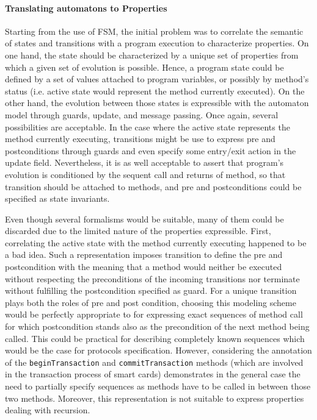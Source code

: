 \paragraph{Translating automatons to Properties}
Starting from the use of FSM, the initial problem was to correlate the semantic of states and transitions with a program execution to characterize properties. On one hand, the state should be characterized by a unique set of properties from which a given set of evolution is possible. Hence, a program state could be defined by a set of values attached to program variables, or possibly by method's status (i.e. active state would represent the method currently executed). On the other hand, the evolution between those states is expressible with the automaton model through guards, update, and message passing. Once again, several possibilities are acceptable. In the case where the active state represents the method currently executing, transitions might be use to express pre and postconditions through guards and even specify some entry/exit action in the update field. Nevertheless, it is as well acceptable to assert that program's evolution is conditioned by the sequent call and returns of method, so that transition should be attached to methods, and pre and postconditions could be specified as state invariants.

Even though several formalisms would be suitable, many of them could be discarded due to the limited nature of the properties expressible. First, correlating the active state with the method currently executing happened to be a bad idea. Such a representation imposes transition to define the pre and postcondition with the meaning that a method would neither be executed without respecting the preconditions of the incoming transitions nor terminate without fulfilling the postcondition specified as guard. For a unique transition plays both the roles of pre and post condition, choosing this modeling scheme would be perfectly appropriate to for expressing exact sequences of method call for which postcondition stands also as the precondition of the next method being called. This could be practical for describing completely known sequences which would be the case for protocols specification. However, considering the annotation of the {\tt beginTransaction} and {\tt commitTransaction} methods (which are involved in the transaction process of smart cards) demonstrates in the general case the need to partially specify sequences as methods have to be called in between those two methods. Moreover, this representation is not suitable to express properties dealing with recursion.

